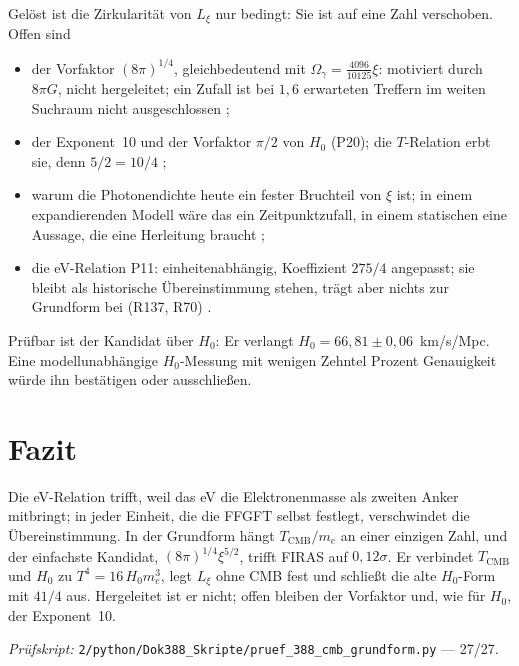 Gelöst ist die Zirkularität von $L_\xi$ nur bedingt: Sie ist auf eine Zahl verschoben. Offen sind
\begin{itemize}
\item der Vorfaktor $(8\pi)^{1/4}$, gleichbedeutend mit $\Omega_\gamma=\frac{4096}{10125}\xi$:
motiviert durch $8\pi G$, nicht hergeleitet; ein Zufall ist bei $1{,}6$ erwarteten Treffern im
weiten Suchraum nicht ausgeschlossen \SM;
\item der Exponent~10 und der Vorfaktor $\pi/2$ von $H_0$ (P20); die $T$-Relation erbt sie, denn
$5/2=10/4$ \SM;
\item warum die Photonendichte heute ein fester Bruchteil von $\xi$ ist; in einem expandierenden
Modell wäre das ein Zeitpunktzufall, in einem statischen eine Aussage, die eine Herleitung braucht
\SM;
\item die eV-Relation P11: einheitenabhängig, Koeffizient $275/4$ angepasst; sie bleibt als
historische Übereinstimmung stehen, trägt aber nichts zur Grundform bei (R137, R70) \SM.
\end{itemize}
Prüfbar ist der Kandidat über $H_0$: Er verlangt $H_0=66{,}81\pm0{,}06$~km/s/Mpc. Eine
modellunabhängige $H_0$-Messung mit wenigen Zehntel Prozent Genauigkeit würde ihn bestätigen
oder ausschließen.

\section{Fazit}

Die eV-Relation trifft, weil das eV die Elektronenmasse als zweiten Anker mitbringt; in jeder
Einheit, die die FFGFT selbst festlegt, verschwindet die Übereinstimmung. In der Grundform hängt
$T_{\mathrm{CMB}}/m_e$ an einer einzigen Zahl, und der einfachste Kandidat,
$(8\pi)^{1/4}\xi^{5/2}$, trifft FIRAS auf $0{,}12\sigma$. Er verbindet $T_{\mathrm{CMB}}$ und $H_0$
zu $T^4=16\,H_0m_e^3$, legt $L_\xi$ ohne CMB fest und schließt die alte $H_0$-Form mit $41/4$ aus.
Hergeleitet ist er nicht; offen bleiben der Vorfaktor und, wie für $H_0$, der Exponent~10.

\vspace{1em}
\noindent\textit{Prüfskript:} \texttt{2/python/Dok388\_Skripte/pruef\_388\_cmb\_grundform.py}
--- 27/27.
